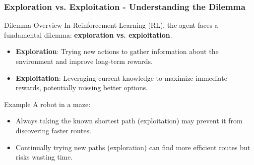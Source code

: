 \documentclass[aspectratio=169]{beamer}
\begin{document}
\begin{frame}[fragile]
    \frametitle{Exploration vs. Exploitation - Understanding the Dilemma}
    \begin{block}{Dilemma Overview}
        In Reinforcement Learning (RL), the agent faces a fundamental dilemma:
        \textbf{exploration vs. exploitation}.
    \end{block}
    \begin{itemize}
        \item \textbf{Exploration}: Trying new actions to gather information about the environment and improve long-term rewards.
        \item \textbf{Exploitation}: Leveraging current knowledge to maximize immediate rewards, potentially missing better options.
    \end{itemize}
    \begin{block}{Example}
        A robot in a maze:
        \begin{itemize}
            \item Always taking the known shortest path (exploitation) may prevent it from discovering faster routes.
            \item Continually trying new paths (exploration) can find more efficient routes but risks wasting time.
        \end{itemize}
    \end{block}
\end{frame}
\end{document}

